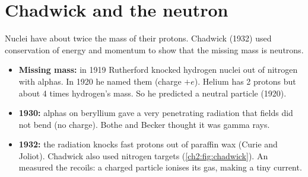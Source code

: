 \section{Chadwick and the neutron}\label{ch2:sec:neutron}

\begin{bigidea}
Nuclei have about twice the mass of their protons. Chadwick (1932) used conservation of
energy and momentum to show that the missing mass is neutrons.
\end{bigidea}

\begin{keywords}
\end{keywords}

\begin{itemize}
  \item \textbf{Missing mass:} in 1919 Rutherford knocked hydrogen nuclei out of nitrogen with
        alphas. In 1920 he named them  (charge $+e$). Helium has 2 protons but
        about 4 times hydrogen's mass. So he predicted a neutral particle (1920).
  \item \textbf{1930:} alphas on beryllium gave a very penetrating radiation that fields did not bend
        (no charge). Bothe and Becker thought it was gamma rays.
  \item \textbf{1932:} the radiation knocks fast protons out of paraffin wax (Curie and Joliot).
        Chadwick also used nitrogen targets (\cref{ch2:fig:chadwick}). An 
        measured the recoils: a charged particle ionises its gas, making a tiny current.
\end{itemize}

